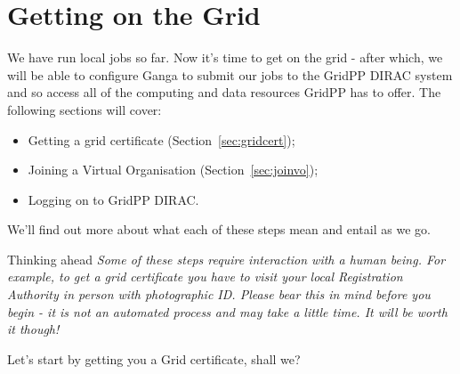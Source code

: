 \section{Getting on the Grid}
\label{sec:onthegrid}
We have run local jobs so far. Now it's time to get on the grid - after
which, we will be able to configure Ganga to submit our jobs to the
GridPP DIRAC system and so access all of the computing and data
resources GridPP has to offer. The following sections will cover:

\begin{itemize}
\tightlist
\item
  Getting a grid certificate (Section~\ref{sec:gridcert});
\item
  Joining a Virtual Organisation (Section~\ref{sec:joinvo});
\item
  Logging on to GridPP DIRAC.
\end{itemize}

We'll find out more about what each of these steps mean and entail as we
go.

\begin{warningbox}{Thinking ahead}
\emph{Some of these steps require interaction with a human being. For example,
to get a grid certificate you have to visit your local Registration
Authority in person with photographic ID. Please bear this in mind
before you begin - it is not an automated process and may take a little
time. It will be worth it though!}
\end{warningbox}

Let's start by getting you a Grid certificate, shall we?












